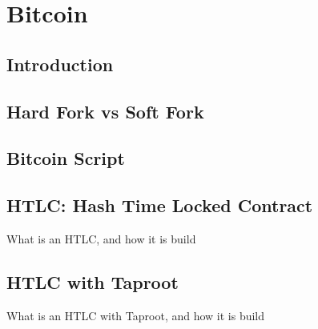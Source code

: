 \chapter{Bitcoin}

\section{Introduction}

\section{Hard Fork vs Soft Fork}
\label{sec:hard_vs_soft}

\section{Bitcoin Script}

\section{HTLC: Hash Time Locked Contract}

What is an HTLC, and how it is build

\section{HTLC with Taproot}
What is an HTLC with Taproot, and how it is build
